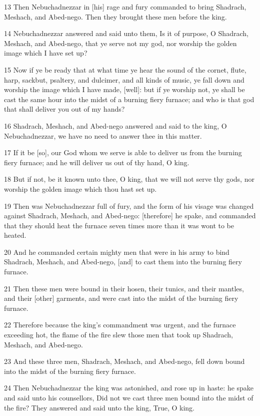 \par 13 Then Nebuchadnezzar in [his] rage and fury commanded to bring Shadrach, Meshach, and Abed-nego. Then they brought these men before the king.
\par 14 Nebuchadnezzar answered and said unto them, Is it of purpose, O Shadrach, Meshach, and Abed-nego, that ye serve not my god, nor worship the golden image which I have set up?
\par 15 Now if ye be ready that at what time ye hear the sound of the cornet, flute, harp, sackbut, psaltery, and dulcimer, and all kinds of music, ye fall down and worship the image which I have made, [well]: but if ye worship not, ye shall be cast the same hour into the midst of a burning fiery furnace; and who is that god that shall deliver you out of my hands?
\par 16 Shadrach, Meshach, and Abed-nego answered and said to the king, O Nebuchadnezzar, we have no need to answer thee in this matter.
\par 17 If it be [so], our God whom we serve is able to deliver us from the burning fiery furnace; and he will deliver us out of thy hand, O king.
\par 18 But if not, be it known unto thee, O king, that we will not serve thy gods, nor worship the golden image which thou hast set up.
\par 19 Then was Nebuchadnezzar full of fury, and the form of his visage was changed against Shadrach, Meshach, and Abed-nego: [therefore] he spake, and commanded that they should heat the furnace seven times more than it was wont to be heated.
\par 20 And he commanded certain mighty men that were in his army to bind Shadrach, Meshach, and Abed-nego, [and] to cast them into the burning fiery furnace.
\par 21 Then these men were bound in their hosen, their tunics, and their mantles, and their [other] garments, and were cast into the midst of the burning fiery furnace.
\par 22 Therefore because the king's commandment was urgent, and the furnace exceeding hot, the flame of the fire slew those men that took up Shadrach, Meshach, and Abed-nego.
\par 23 And these three men, Shadrach, Meshach, and Abed-nego, fell down bound into the midst of the burning fiery furnace.
\par 24 Then Nebuchadnezzar the king was astonished, and rose up in haste: he spake and said unto his counsellors, Did not we cast three men bound into the midst of the fire? They answered and said unto the king, True, O king.

